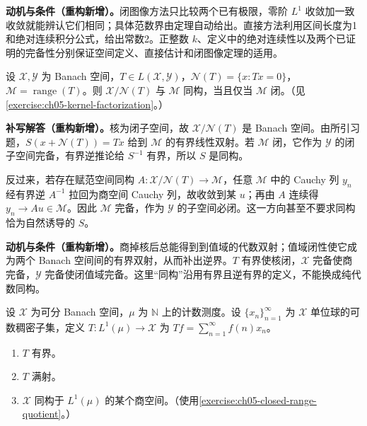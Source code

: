 \documentclass[../../main.tex]{subfiles}
\begin{document}
\begin{remark}
\textbf{动机与条件（重构新增）。}闭图像方法只比较两个已有极限，零阶 $L^1$ 收敛加一致收敛就能辨认它们相同；具体范数界由定理自动给出。直接方法利用区间长度为1和绝对连续积分公式，给出常数2。正整数 $k$、定义中的绝对连续性以及两个已证明的完备性分别保证空间定义、直接估计和闭图像定理的适用。
\end{remark}
\begin{exercise}\label{exercise:ch05-closed-range-quotient}
设 $\mathcal X,\mathcal Y$ 为 Banach 空间，$T\in L(\mathcal X,\mathcal Y)$，$\mathcal N(T)=\{x:Tx=0\}$，$\mathcal M=\operatorname{range}(T)$。则 $\mathcal X/\mathcal N(T)$ 与 $\mathcal M$ 同构，当且仅当 $\mathcal M$ 闭。（见\cref{exercise:ch05-kernel-factorization}。）
\end{exercise}
\begin{solution}
\textbf{补写解答（重构新增）。}核为闭子空间，故 $\mathcal X/\mathcal N(T)$ 是 Banach 空间。由所引习题，$S(x+\mathcal N(T))=Tx$ 给到 $\mathcal M$ 的有界线性双射。若 $\mathcal M$ 闭，它作为 $\mathcal Y$ 的闭子空间完备，有界逆推论给 $S^{-1}$ 有界，所以 $S$ 是同构。

反过来，若存在赋范空间同构 $A:\mathcal X/\mathcal N(T)\to\mathcal M$，任意 $\mathcal M$ 中的 Cauchy 列 $y_n$ 经有界逆 $A^{-1}$ 拉回为商空间 Cauchy 列，故收敛到某 $u$；再由 $A$ 连续得 $y_n\to Au\in\mathcal M$。因此 $\mathcal M$ 完备，作为 $\mathcal Y$ 的子空间必闭。这一方向甚至不要求同构恰为自然诱导的 $S$。
\end{solution}
\begin{remark}
\textbf{动机与条件（重构新增）。}商掉核后总能得到到值域的代数双射；值域闭性使它成为两个 Banach 空间间的有界双射，从而补出逆界。$T$ 有界使核闭，$\mathcal X$ 完备使商完备，$\mathcal Y$ 完备使闭值域完备。这里“同构”沿用有界且逆有界的定义，不能换成纯代数同构。
\end{remark}
\begin{exercise}\label{exercise:ch05-l1-universal-quotient}
设 $\mathcal X$ 为可分 Banach 空间，$\mu$ 为 $\mathbb N$ 上的计数测度。设 $\{x_n\}_{n=1}^{\infty}$ 为 $\mathcal X$ 单位球的可数稠密子集，定义 $T:L^1(\mu)\to\mathcal X$ 为 $Tf=\sum_{n=1}^{\infty}f(n)x_n$。
\begin{enumerate}
\item\label{item:ch05-universal-map-bounded} $T$ 有界。
\item\label{item:ch05-universal-map-onto} $T$ 满射。
\item\label{item:ch05-universal-quotient} $\mathcal X$ 同构于 $L^1(\mu)$ 的某个商空间。（使用\cref{exercise:ch05-closed-range-quotient}。）
\end{enumerate}
\end{exercise}
\end{document}
